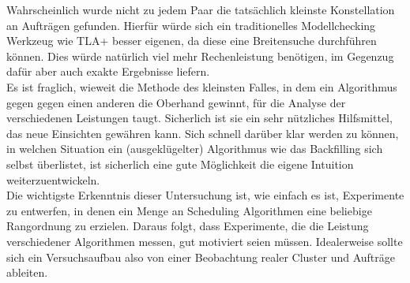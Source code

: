 Wahrscheinlich wurde nicht zu jedem Paar die tatsächlich kleinste Konstellation an Aufträgen gefunden. Hierfür würde sich ein traditionelles Modellchecking Werkzeug wie TLA+ besser eigenen, da diese eine Breitensuche durchführen können. Dies würde natürlich viel mehr Rechenleistung benötigen, im Gegenzug dafür aber auch exakte Ergebnisse liefern.\\
Es ist fraglich, wieweit die Methode des kleinsten Falles, in dem ein Algorithmus gegen gegen einen anderen die Oberhand gewinnt, für die Analyse der verschiedenen Leistungen taugt. Sicherlich ist sie ein sehr nützliches Hilfsmittel, das neue Einsichten gewähren kann. Sich schnell darüber klar werden zu können, in welchen Situation ein (ausgeklügelter) Algorithmus wie das Backfilling sich selbst überlistet, ist sicherlich eine gute Möglichkeit die eigene Intuition weiterzuentwickeln.\\

Die wichtigste Erkenntnis dieser Untersuchung ist, wie einfach es ist, Experimente zu entwerfen, in denen ein Menge an Scheduling Algorithmen eine beliebige Rangordnung zu erzielen. Daraus folgt, dass Experimente, die die Leistung verschiedener Algorithmen messen, gut motiviert seien müssen. Idealerweise sollte sich ein Versuchsaufbau also von einer Beobachtung realer Cluster und Aufträge ableiten.

\FloatBarrier


